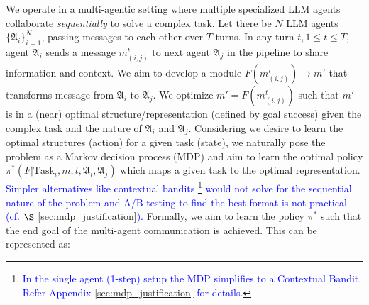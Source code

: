 We operate in a multi-agentic setting where multiple specialized LLM agents collaborate \emph{sequentially} to solve a complex task. 
Let there be $N$ LLM agents $\{\mathfrak{A}_i\}_{i=1}^N$, passing messages to each other over $T$ turns. In any turn $t, 1 \leq t \leq T$, agent $\mathfrak{A}_i$ sends a message $m_{(i,j)}^t$ to next agent $\mathfrak{A}_j$ in the pipeline to share information and context. We aim to develop a 
module $F(m_{(i,j)}^t) \rightarrow m'$ that transforms message from $\mathfrak{A}_i$ to $\mathfrak{A}_j$. We optimize $m'=F(m_{(i,j)}^t)$ such that $m'$ is in a (near) optimal structure/representation (defined by goal success) given the complex task and the nature of $\mathfrak{A}_i$ and $\mathfrak{A}_j$. 
Considering we desire to learn the optimal structures (action) for a given task (state), we naturally pose the problem as a Markov decision process (MDP) \cite{puterman1994markov} and aim to learn the optimal policy $\pi^*(F|\text{Task}_i,m,t,\mathfrak{A}_i, \mathfrak{A}_j)$ which maps a given task to the optimal representation.
\textcolor{blue}{Simpler alternatives like contextual bandits \footnote{\textcolor{blue}{In the single agent (1-step) setup the MDP simplifies to a Contextual Bandit. Refer Appendix \ref{sec:mdp_justification} for details.}} would not solve for the sequential nature of the problem and A/B testing to find the best format is not practical (cf. $\S$ \ref{sec:mdp_justification}).}
Formally, we aim to learn the policy $\pi^*$ such that the end goal of the multi-agent communication is achieved. This can be represented as:
